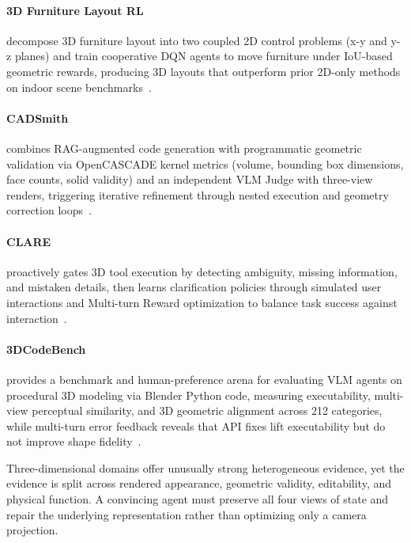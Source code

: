\paragraph{3D Furniture Layout RL}
decompose 3D furniture layout into two coupled 2D control problems (x-y and y-z planes) and train cooperative DQN agents to move furniture under IoU-based geometric rewards, producing 3D layouts that outperform prior 2D-only methods on indoor scene benchmarks~\cite{avg210209137}.

\paragraph{CADSmith} combines RAG-augmented code generation with programmatic geometric validation via OpenCASCADE kernel metrics (volume, bounding box dimensions, face counts, solid validity) and an independent VLM Judge with three-view renders, triggering iterative refinement through nested execution and geometry correction loops~\cite{barkley2026cadsmith}.

\paragraph{CLARE} proactively gates 3D tool execution by detecting ambiguity, missing information, and mistaken details, then learns clarification policies through simulated user interactions and Multi-turn Reward optimization to balance task success against interaction~\cite{avg260716352}.


\paragraph{3DCodeBench} provides a benchmark and human-preference arena for evaluating VLM agents on procedural 3D modeling via Blender Python code, measuring executability, multi-view perceptual similarity, and 3D geometric alignment across 212 categories, while multi-turn error feedback reveals that API fixes lift executability but do not improve shape fidelity~\cite{avg260601057}.


Three-dimensional domains offer unusually strong heterogeneous evidence, yet the evidence is split across rendered appearance, geometric validity, editability, and physical function. A convincing agent must preserve all four views of state and repair the underlying representation rather than optimizing only a camera projection.

\FloatBarrier
